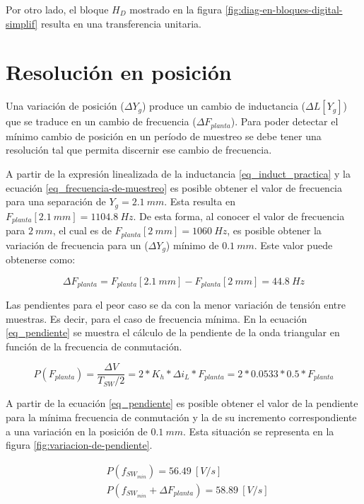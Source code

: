 \noindent Por otro lado, el bloque $H_D$ mostrado en la figura \ref{fig:diag-en-bloques-digital-simplif} resulta en una transferencia unitaria.

\section{Resolución en posición}

\noindent Una variación de posición ($\Delta Y_g$) produce un cambio de inductancia ($\Delta L[Y_g]$) que se traduce en un cambio de frecuencia ($\Delta F_{planta}$). Para poder detectar el mínimo cambio de posición en un período de muestreo se debe tener una resolución tal que permita discernir ese cambio de frecuencia.


\noindent A partir de la expresión linealizada de la inductancia \ref{eq_induct_practica} y la ecuación \ref{eq_frecuencia-de-muestreo} es posible obtener el valor de frecuencia para una separación de $Y_g=2.1\:mm$. Esta resulta en $F_{planta}[2.1\:mm] = 1104.8\:Hz$. De esta forma, al conocer el valor de frecuencia para $2\:mm$, el cual es de $F_{planta}[2\:mm] = 1060\:Hz$, es posible obtener la variación de frecuencia para un ($\Delta Y_g$) mínimo de  $0.1\:mm$. Este valor puede obtenerse como:

\begin{equation} 
	\Delta F_{planta} = F_{planta}[2.1\:mm] - F_{planta}[2\:mm] = 44.8\:Hz
\end{equation}

\noindent Las pendientes para el peor caso se da con la menor variación de tensión entre muestras. Es decir, para el caso de frecuencia mínima. En la ecuación \ref{eq_pendiente} se muestra el cálculo de la pendiente de la onda triangular en función de la frecuencia de conmutación.

\begin{equation} \label{eq_pendiente}
	P(F_{planta}) = \frac{\Delta V}{T_{SW}/2} = 2*K_h*\Delta i_L*F_{planta} = 2 * 0.0533 * 0.5 * F_{planta}
\end{equation}

\noindent A partir de la ecuación \ref{eq_pendiente} es posible obtener el valor de la pendiente para la mínima frecuencia de conmutación y la de su incremento correspondiente a una variación en la posición de $0.1\:mm$. Esta situación se representa en la figura \ref{fig:variacion-de-pendiente}.

\begin{equation} 
	\begin{aligned}
		&P(f_{SW_{min}}) = 56.49\:[V/s] \\
		&P(f_{SW_{min}} + \Delta F_{planta}) = 58.89\:[V/s] \\
	\end{aligned}
\end{equation}

